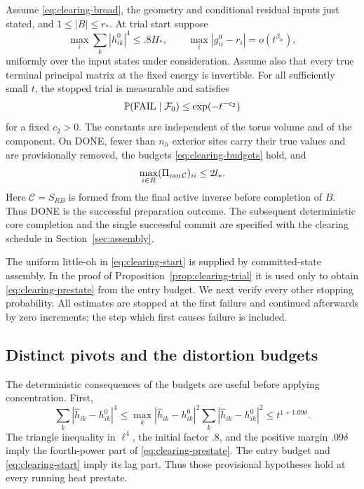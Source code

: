 \begin{proposition}\label{prop:clearing-trial}
Assume \eqref{eq:clearing-broad}, the geometry and conditional residual
inputs just stated, and $1\le |B|\le r_*$.  At trial start suppose
\begin{equation}\label{eq:clearing-start}
 \max_i\sum_k|h^0_{ik}|^4\le .8H_*,\qquad
 \max_i|g^0_{ii}-r_i|=o(t^{\beta_w}),
\end{equation}
uniformly over the input states under consideration.  Assume also that every
true terminal principal matrix at the fixed energy is invertible.
For all sufficiently small $t$, the stopped trial is measurable and satisfies
\[
 \mathbb P(\mathrm{FAIL}\mid\mathcal F_0)\le\exp(-t^{-c_2})
\]
for a fixed $c_2>0$.  The constants are independent of the torus volume and of
the component.  On DONE, fewer than $n_h$ exterior sites carry their true values and
are provisionally removed, the budgets \eqref{eq:clearing-budgets} hold, and
\begin{equation}\label{eq:clearing-projection-output}
 \max_{i\in R}(\Pi_{\operatorname{ran}\mathcal C})_{ii}\le2l_*.
\end{equation}
Here $\mathcal C=S_{RB}$ is formed from the final active inverse before
completion of $B$. Thus DONE is the successful preparation outcome. The
subsequent deterministic core completion and the single successful commit
are specified with the clearing schedule in Section~\ref{sec:assembly}.
\end{proposition}

The uniform little-oh in \eqref{eq:clearing-start} is supplied by committed-state
assembly.  In the proof of Proposition~\ref{prop:clearing-trial} it is used only to obtain
\eqref{eq:clearing-prestate} from the entry budget.  We next verify every other
stopping probability.  All estimates are stopped at the first failure and
continued afterwards by zero increments; the step which first causes failure
is included.

\subsection{Distinct pivots and the distortion budgets}

The deterministic consequences of the budgets are useful before applying
concentration.  First,
\begin{equation}\label{eq:clearing-fourth-distortion}
 \sum_k|\hat h_{ik}-h^0_{ik}|^4
 \le\max_k|\hat h_{ik}-h^0_{ik}|^2
       \sum_k|\hat h_{ik}-h^0_{ik}|^2
 \le t^{1+1.09\delta}.
\end{equation}
The triangle inequality in $\ell^4$, the initial factor $.8$, and the positive
margin $.09\delta$ imply the fourth-power part of
\eqref{eq:clearing-prestate}.  The entry budget and
\eqref{eq:clearing-start} imply its lag part. Thus those provisional
hypotheses hold at every running heat prestate.

